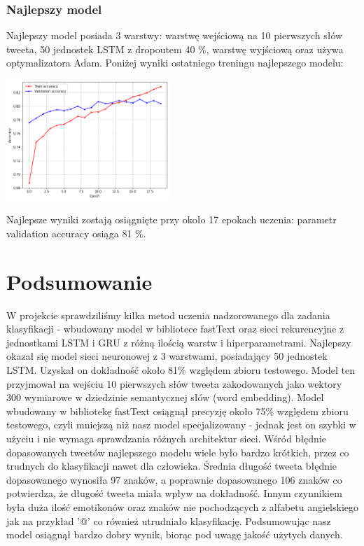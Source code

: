 \documentclass[11pt, a4paper, notitlepage]{report}
\begin{document}
\subsection{Najlepszy model}
Najlepszy model posiada 3 warstwy: warstwę wejściową na 10 pierwszych słów tweeta, 50 jednostek LSTM z dropoutem 40 \%, warstwę wyjściową oraz używa optymalizatora Adam. Poniżej wyniki ostatniego treningu najlepszego modelu:
\begin{center}
\includegraphics[width=175pt]{graphics/best_model_accuracy.png}
\end{center}

Najlepsze wyniki zostają osiągnięte przy około 17 epokach uczenia: parametr validation accuracy osiąga 81 \%.


\chapter{Podsumowanie}
W projekcie sprawdziliśmy kilka metod uczenia nadzorowanego dla zadania klasyfikacji - wbudowany model w bibliotece fastText oraz sieci rekurencyjne z jednostkami LSTM i GRU z różną ilością warstw i hiperparametrami. Najlepszy okazał się model sieci neuronowej z 3 warstwami, posiadający 50 jednostek LSTM. Uzyskał on dokładność około 81\% względem zbioru testowego. Model ten przyjmował na wejściu 10 pierwszych słów tweeta zakodowanych jako wektory 300 wymiarowe w dziedzinie semantycznej słów (word embedding). Model wbudowany w bibliotekę fastText osiągnął precyzję około 75\% względem zbioru testowego, czyli mniejszą niż nasz model specjalizowany - jednak jest on szybki w użyciu i nie wymaga sprawdzania różnych architektur sieci. Wśród błędnie dopasowanych tweetów najlepszego modelu wiele było bardzo krótkich, przez co trudnych do klasyfikacji nawet dla człowieka. Średnia długość tweeta błędnie dopasowanego wynosiła 97 znaków, a poprawnie dopasowanego 106 znaków co potwierdza, że długość tweeta miała wpływ na dokładność. Innym czynnikiem była duża ilość emotikonów oraz znaków nie pochodzących z alfabetu angielskiego jak na przykład '@' co również utrudniało klasyfikację. Podsumowując nasz model osiągnął bardzo dobry wynik, biorąc pod uwagę jakość użytych danych.
\end{document}
